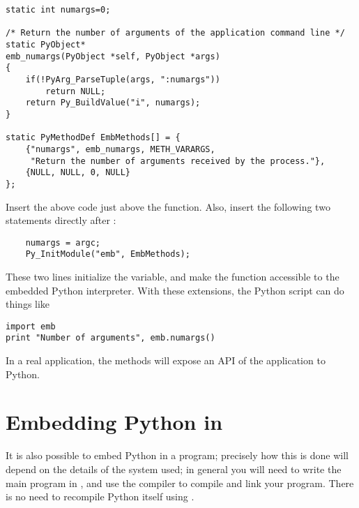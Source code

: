 \begin{verbatim}
static int numargs=0;

/* Return the number of arguments of the application command line */
static PyObject*
emb_numargs(PyObject *self, PyObject *args)
{
    if(!PyArg_ParseTuple(args, ":numargs"))
        return NULL;
    return Py_BuildValue("i", numargs);
}

static PyMethodDef EmbMethods[] = {
    {"numargs", emb_numargs, METH_VARARGS,
     "Return the number of arguments received by the process."},
    {NULL, NULL, 0, NULL}
};
\end{verbatim}

Insert the above code just above the  function.
Also, insert the following two statements directly after
:

\begin{verbatim}
    numargs = argc;
    Py_InitModule("emb", EmbMethods);
\end{verbatim}

These two lines initialize the  variable, and make the
 function accessible to the embedded Python
interpreter.  With these extensions, the Python script can do things
like

\begin{verbatim}
import emb
print "Number of arguments", emb.numargs()
\end{verbatim}

In a real application, the methods will expose an API of the
application to Python.


%


\section{Embedding Python in \Cpp
     \label{embeddingInCplusplus}}

It is also possible to embed Python in a \Cpp{} program; precisely how this
is done will depend on the details of the \Cpp{} system used; in general you
will need to write the main program in \Cpp, and use the \Cpp{} compiler
to compile and link your program.  There is no need to recompile Python
itself using \Cpp.


